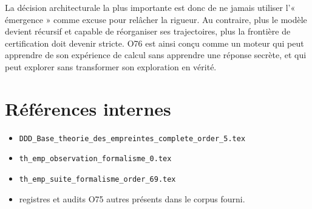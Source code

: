 \documentclass[11pt,a4paper]{article}
\begin{document}
La décision architecturale la plus importante est donc de ne jamais utiliser l'« émergence » comme excuse pour relâcher la rigueur. Au contraire, plus le modèle devient récursif et capable de réorganiser ses trajectoires, plus la frontière de certification doit devenir stricte. O76 est ainsi conçu comme un moteur qui peut apprendre de son expérience de calcul sans apprendre une réponse secrète, et qui peut explorer sans transformer son exploration en vérité.

\section*{Références internes}
\begin{itemize}
\item \texttt{DDD\_Base\_theorie\_des\_empreintes\_complete\_order\_5.tex}
\item \texttt{th\_emp\_observation\_formalisme\_0.tex}
\item \texttt{th\_emp\_suite\_formalisme\_order\_69.tex}
\item registres et audits O75
autres présents dans le corpus fourni.
\end{itemize}
\end{document}
